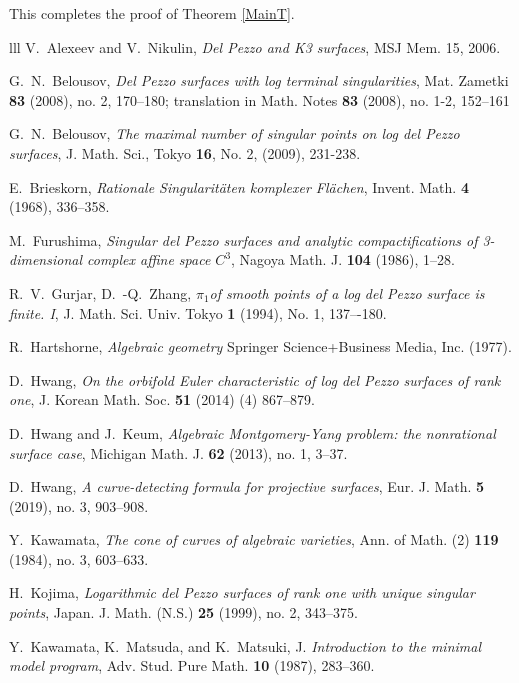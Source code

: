 \documentclass[10pt,oneside,reqno]{amsart}
\theoremstyle{definition}
\theoremstyle{remark}
\numberwithin{equation}{section}
\begin{document}
This completes the proof of   Theorem \ref{MainT}.

\begin{thebibliography}{lll}
V.~Alexeev and  V.~Nikulin, \emph{Del Pezzo and K3 surfaces}, MSJ Mem. 15, 2006.

G.~N.~Belousov, \emph{Del Pezzo surfaces with log terminal singularities}, Mat. Zametki \textbf{83} (2008), no. 2, 170--180; translation in Math. Notes \textbf{83} (2008), no. 1-2, 152--161

G.~N.~Belousov, \emph{The maximal number of singular points on log del Pezzo surfaces}, J. Math. Sci., Tokyo \textbf{16}, No. 2, (2009), 231-238.

E.~Brieskorn, \emph{Rationale Singularit\"{a}ten komplexer
Fl\"{a}chen}, Invent. Math. \textbf{4} (1968), 336--358.

M.~Furushima, \emph{Singular del Pezzo surfaces and analytic
compactifications of 3-dimensional complex affine space $C^3$},
Nagoya Math. J. \textbf{104} (1986), 1--28.

R.~V.~Gurjar, D.~-Q.~Zhang, \emph{$\pi_1$of smooth points of a log del Pezzo surface is finite. I}, J. Math. Sci. Univ. Tokyo \textbf{1} (1994), No. 1, 137–-180.


R.~Hartshorne, \emph{Algebraic geometry} Springer Science+Business Media, Inc. (1977).

D.~Hwang, \emph{On the orbifold Euler characteristic of log del Pezzo surfaces of rank one},
J. Korean Math. Soc. \textbf{51} (2014)  (4) 867--879.

D.~Hwang and J.~Keum, \emph{Algebraic Montgomery-Yang problem: the nonrational surface case}, Michigan Math. J. \textbf{62} (2013), no. 1, 3--37.

D.~Hwang,  \emph{A curve-detecting formula for projective surfaces}, Eur. J. Math. \textbf{5} (2019), no. 3, 903--908.


Y.~Kawamata, \emph{The cone of curves of algebraic varieties},
Ann. of Math. (2) \textbf{119} (1984), no. 3, 603--633.

H.~Kojima, \emph{Logarithmic del Pezzo surfaces of rank one with unique singular points}, Japan. J. Math. (N.S.) \textbf{25} (1999), no. 2, 343--375.

Y.~Kawamata, K.~Matsuda, and K.~Matsuki, J. \emph{Introduction to the
minimal model program}, Adv. Stud. Pure Math. \textbf{10} (1987),
283--360.


\end{thebibliography}
\end{document}

